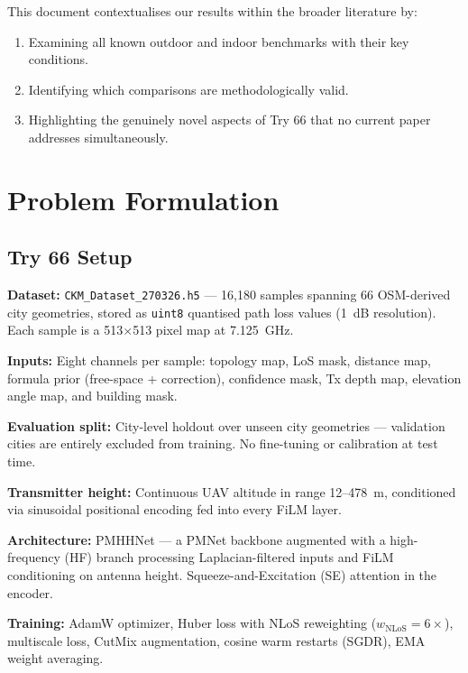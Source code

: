 \documentclass[11pt,a4paper]{article}
\begin{document}
This document contextualises our results within the broader literature by:
\begin{enumerate}[nosep]
    \item Examining all known outdoor and indoor benchmarks with their key conditions.
    \item Identifying which comparisons are methodologically valid.
    \item Highlighting the genuinely novel aspects of Try 66 that no current paper
          addresses simultaneously.
\end{enumerate}

\section{Problem Formulation}
\label{sec:problem}

\subsection{Try 66 Setup}

\textbf{Dataset:} \texttt{CKM\_Dataset\_270326.h5} — 16,180 samples spanning 66
OSM-derived city geometries, stored as \texttt{uint8} quantised path loss values (1~dB
resolution). Each sample is a 513$\times$513 pixel map at 7.125~GHz.

\textbf{Inputs:} Eight channels per sample: topology map, LoS mask, distance map,
formula prior (free-space + correction), confidence mask, Tx depth map, elevation
angle map, and building mask.

\textbf{Evaluation split:} City-level holdout over unseen city geometries —
validation cities are entirely excluded from training. No fine-tuning or
calibration at test time.

\textbf{Transmitter height:} Continuous UAV altitude in range 12--478~m, conditioned
via sinusoidal positional encoding fed into every FiLM layer.

\textbf{Architecture:} PMHHNet — a PMNet backbone augmented with a high-frequency
(HF) branch processing Laplacian-filtered inputs and FiLM conditioning on antenna
height. Squeeze-and-Excitation (SE) attention in the encoder.

\textbf{Training:} AdamW optimizer, Huber loss with NLoS reweighting
($w_\mathrm{NLoS} = 6\times$), multiscale loss, CutMix augmentation, cosine warm
restarts (SGDR), EMA weight averaging.
\end{document}
